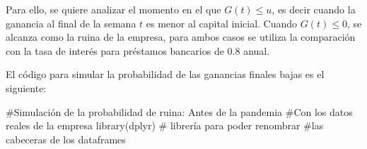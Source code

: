 \documentclass[
  us-letterpaper,
]{scrreprt}
\newenvironment{Shaded}{\begin{snugshade}}{\end{snugshade}}
\newcommand{\CommentTok}[1]{\textcolor[rgb]{0.37,0.37,0.37}{#1}}
\newcommand{\FunctionTok}[1]{\textcolor[rgb]{0.28,0.35,0.67}{#1}}
\newcommand{\NormalTok}[1]{\textcolor[rgb]{0.00,0.23,0.31}{#1}}
\theoremstyle{definition}
\theoremstyle{plain}
\theoremstyle{plain}
\theoremstyle{remark}
\begin{document}
Para ello, se quiere analizar el momento en el que \(G(t)\leq u\), es
decir cuando la ganancia al final de la semana \(t\) es menor al capital
inicial. Cuando \(G(t)\leq0\), se alcanza como la ruina de la empresa,
para ambos casos se utiliza la comparación con la tasa de interés para
préstamos bancarios de \(0.8\) anual.

El código para simular la probabilidad de las ganancias finales bajas es
el siguiente:

\begin{Shaded}
\begin{Highlighting}[]
\CommentTok{\#Simulación de la probabilidad de ruina: Antes de la pandemia}
\CommentTok{\#Con los datos reales de la empresa}
\FunctionTok{library}\NormalTok{(dplyr) }\CommentTok{\# librería para poder renombrar }
\CommentTok{\#las cabeceras de los dataframes}


\end{Highlighting}
\end{Shaded}
\end{document}
